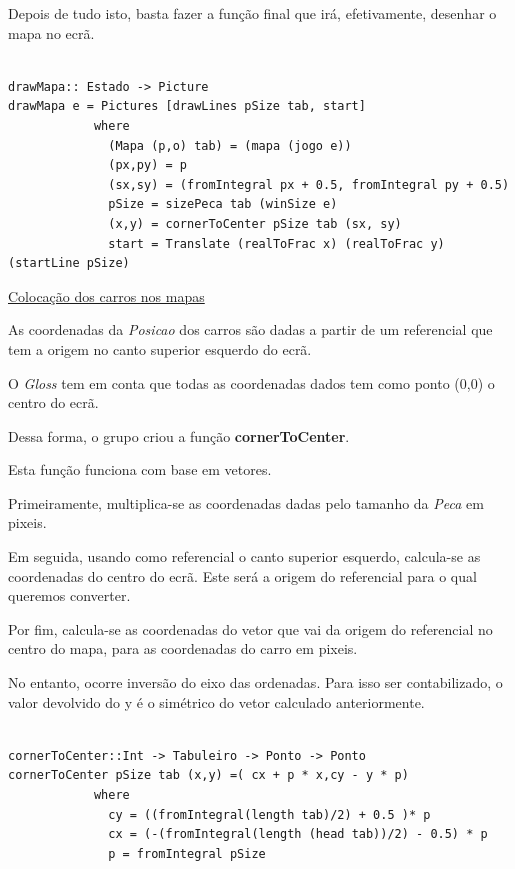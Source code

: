 \documentclass[a4paper]{report} %
\begin{document}
\normalsize

Depois de tudo isto, basta fazer a função final que irá, efetivamente, desenhar o mapa no ecrã. 

\scriptsize

\begin{verbatim}

drawMapa:: Estado -> Picture
drawMapa e = Pictures [drawLines pSize tab, start]
            where
              (Mapa (p,o) tab) = (mapa (jogo e))
              (px,py) = p
              (sx,sy) = (fromIntegral px + 0.5, fromIntegral py + 0.5)
              pSize = sizePeca tab (winSize e)
              (x,y) = cornerToCenter pSize tab (sx, sy) 
              start = Translate (realToFrac x) (realToFrac y) (startLine pSize)

\end{verbatim}

\normalsize

\newpage

\maketitle\underline{Colocação dos carros nos mapas} 

As coordenadas da \emph{Posicao} dos carros são dadas a partir de um referencial que tem a origem no canto superior esquerdo do ecrã.

O \textit{Gloss} tem em conta que todas as coordenadas dados tem como ponto (0,0) o centro do ecrã.

Dessa forma, o grupo criou a função \textbf{cornerToCenter}.

Esta função funciona com base em vetores.

Primeiramente, multiplica-se as coordenadas dadas pelo tamanho da \emph{Peca} em pixeis.

Em seguida, usando como referencial o canto superior esquerdo, calcula-se as coordenadas do centro do ecrã. Este será a origem do referencial para o qual queremos converter.

Por fim, calcula-se as coordenadas do vetor que vai da origem do referencial no centro do mapa, para as coordenadas do carro em pixeis.

No entanto, ocorre inversão do eixo das ordenadas. Para isso ser contabilizado, o valor devolvido do y é o simétrico do vetor calculado anteriormente.

\begin{verbatim}

cornerToCenter::Int -> Tabuleiro -> Ponto -> Ponto
cornerToCenter pSize tab (x,y) =( cx + p * x,cy - y * p) 
            where
              cy = ((fromIntegral(length tab)/2) + 0.5 )* p
              cx = (-(fromIntegral(length (head tab))/2) - 0.5) * p
              p = fromIntegral pSize

\end{verbatim}
\end{document}
